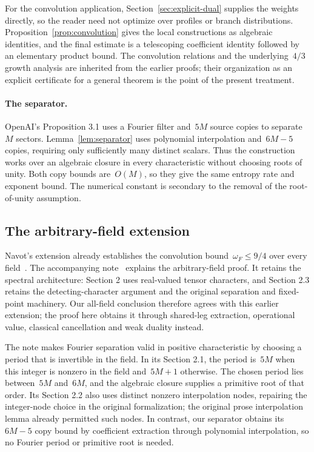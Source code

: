 \documentclass[11pt,letterpaper]{article}
\theoremstyle{definition}
\numberwithin{equation}{section}
\begin{document}
For the convolution application, Section~\ref{sec:explicit-dual} supplies the weights directly, so the reader need not optimize over profiles or branch distributions. Proposition~\ref{prop:convolution} gives the local constructions as algebraic identities, and the final estimate is a telescoping coefficient identity followed by an elementary product bound. The convolution relations and the underlying~$4/3$ growth analysis are inherited from the earlier proofs; their organization as an explicit certificate for a general theorem is the point of the present treatment.

\paragraph{The separator.}
OpenAI's Proposition 3.1 uses a Fourier filter and~$5M$ source copies to separate~$M$ sectors. Lemma~\ref{lem:separator} uses polynomial interpolation and~$6M-5$ copies, requiring only sufficiently many distinct scalars. Thus the construction works over an algebraic closure in every characteristic without choosing roots of unity. Both copy bounds are~$O(M)$, so they give the same entropy rate and exponent bound. The numerical constant is secondary to the removal of the root-of-unity assumption.

\subsection{The arbitrary-field extension}

Navot's extension already establishes the convolution bound~$\omega_F\leq9/4$ over every field~\cite{Navot26}. The accompanying note~\cite[Theorem 1.1]{NavotNote26} explains the arbitrary-field proof. It retains the spectral architecture: Section 2 uses real-valued tensor characters, and Section 2.3 retains the detecting-character argument and the original separation and fixed-point machinery. Our all-field conclusion therefore agrees with this earlier extension; the proof here obtains it through shared-leg extraction, operational value, classical cancellation and weak duality instead.

The note makes Fourier separation valid in positive characteristic by choosing a period that is invertible in the field. In its Section 2.1, the period is~$5M$ when this integer is nonzero in the field and~$5M+1$ otherwise. The chosen period lies between~$5M$ and~$6M$, and the algebraic closure supplies a primitive root of that order. Its Section 2.2 also uses distinct nonzero interpolation nodes, repairing the integer-node choice in the original formalization; the original prose interpolation lemma already permitted such nodes. In contrast, our separator obtains its~$6M-5$ copy bound by coefficient extraction through polynomial interpolation, so no Fourier period or primitive root is needed.
\end{document}
